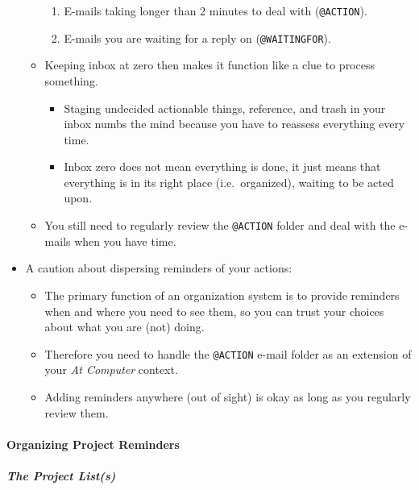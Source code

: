\documentclass{article}
\begin{document}
\begin{itemize}
\begin{itemize}
\begin{enumerate}
        \item E-mails taking longer than 2 minutes to deal with (\texttt{@ACTION}).
        \item E-mails you are waiting for a reply on (\texttt{@WAITINGFOR}).
    \end{enumerate}
    \item Keeping inbox at zero then makes it function like a clue to process something.
    \begin{itemize}
      \item Staging undecided actionable things, reference, and trash in your inbox numbs the mind because you have to reassess everything every time.
      \item Inbox zero does not mean everything is done, it just means that everything is in its right place (i.e.\ organized), waiting to be acted upon.
    \end{itemize}
    \item You still need to regularly review the \texttt{@ACTION} folder and deal with the e-mails when you have time.
  \end{itemize}
  \item A caution about dispersing reminders of your actions:
  \begin{itemize}
    \item The primary function of an organization system is to provide reminders when and where you need to see them, so you can trust your choices about what you are (not) doing.
    \item Therefore you need to handle the \texttt{@ACTION} e-mail folder as an extension of your \textit{At Computer} context.
    \item Adding reminders anywhere (out of sight) is okay as long as you regularly review them.
  \end{itemize}
\end{itemize}

\paragraph{Organizing Project Reminders}

\subparagraph{The Project List(s)}
\end{document}
